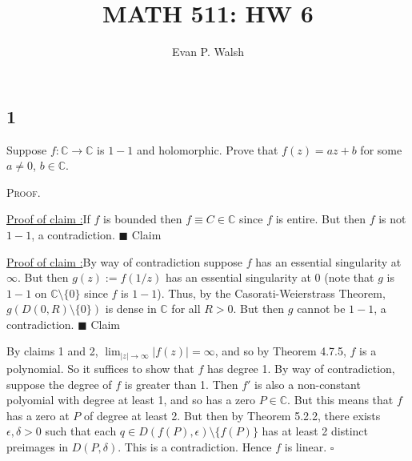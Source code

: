 \documentclass[12pt]{article}
\title{MATH 511: HW 6}
\author{Evan P. Walsh}
\newcounter{ProofCounter}
\newcounter{ClaimCounter}[ProofCounter]
\newenvironment{Proof}{\stepcounter{ProofCounter}\textsc{Proof.}}{\hfill$\square$}
\newenvironment{claim}[1]{\vspace{1mm}\stepcounter{ClaimCounter}\par\noindent\underline{\bf Claim \theClaimCounter:}\space#1}{}
\newenvironment{claimproof}[1]{\par\noindent\underline{Proof of claim \theClaimCounter:}\space#1}{\hfill $\blacksquare$ Claim \theClaimCounter}
\begin{document}
\maketitle


\subsection*{1}
\begin{tcolorbox}
  Suppose $f : \mathbb{C} \rightarrow \mathbb{C}$ is $1-1$ and holomorphic. Prove that $f(z) = az + b$ for some $a \neq 0$, $b \in \mathbb{C}$.  
\end{tcolorbox}
\begin{Proof}
  \begin{claimproof}
    If $f$ is bounded then $f \equiv C \in \mathbb{C}$ since $f$ is entire. But then $f$ is not $1-1$, a contradiction.
  \end{claimproof}

  \begin{claimproof}
    By way of contradiction suppose $f$ has an essential singularity at $\infty$. But then $g(z) := f(1/z)$ has an essential singularity at $0$ (note 
    that $g$ is $1-1$ on $\mathbb{C} \setminus \{0\}$ since $f$ is $1-1$). 
    Thus, by the Casorati-Weierstrass Theorem, $g(D(0,R)\setminus \{0\})$ is dense in $\mathbb{C}$ for all $R > 0$. 
    But then $g$ cannot be $1-1$, a contradiction.
  \end{claimproof}

  By claims 1 and 2, $\lim_{|z|\rightarrow\infty}|f(z)| = \infty$, and so by Theorem 4.7.5, $f$ is a polynomial. So it suffices to show that $f$ has
  degree 1. By way of contradiction, suppose the degree of $f$ is greater than 1. Then $f'$ is also a non-constant polyomial with degree at least 1, and
  so has a zero $P \in \mathbb{C}$. But this means that $f$ has a zero at $P$ of degree at least 2. But then by Theorem 5.2.2, there exists $\epsilon,
  \delta > 0$ such that each $q \in D(f(P),\epsilon) \setminus \{f(P)\}$ has at least 2 distinct preimages in $D(P,\delta)$. This is a contradiction.
  Hence $f$ is linear.
\end{Proof}
\end{document}
